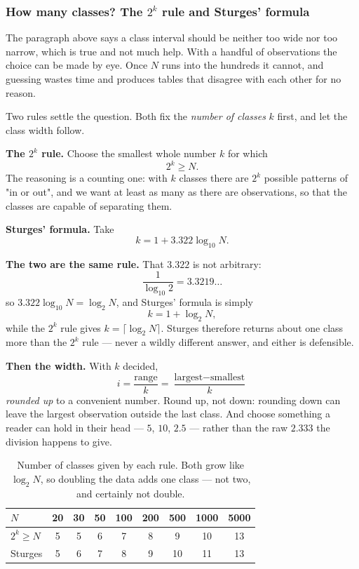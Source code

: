 \documentclass[11pt,a4paper]{article}
\theoremstyle{definition}
\begin{document}
\subsubsection{How many classes? The $2^k$ rule and Sturges' formula}

The paragraph above says a class interval should be neither too wide nor too narrow, which
is true and not much help. With a handful of observations the choice can be made by eye. Once
$N$ runs into the hundreds it cannot, and guessing wastes time and produces tables that
disagree with each other for no reason.

Two rules settle the question. Both fix the \emph{number of classes} $k$ first, and let the
class width follow.

\textbf{The $2^k$ rule.} Choose the smallest whole number $k$ for which
\[2^k\geq N.\]
The reasoning is a counting one: with $k$ classes there are $2^k$ possible patterns of
"in or out", and we want at least as many as there are observations, so that the classes are
capable of separating them.

\textbf{Sturges' formula.} Take
\[k=1+3.322\log_{10}N.\]

\textbf{The two are the same rule.} That $3.322$ is not arbitrary:
\[\frac{1}{\log_{10}2}=3.3219\ldots\]
so $3.322\log_{10}N=\log_2 N$, and Sturges' formula is simply
\[k=1+\log_2 N,\]
while the $2^k$ rule gives $k=\lceil \log_2 N\rceil$. Sturges therefore returns about one
class more than the $2^k$ rule --- never a wildly different answer, and either is defensible.

\textbf{Then the width.} With $k$ decided,
\[i=\frac{\text{range}}{k}=\frac{\text{largest}-\text{smallest}}{k}\]
\emph{rounded up} to a convenient number. Round up, not down: rounding down can leave the
largest observation outside the last class. And choose something a reader can hold in their
head --- $5$, $10$, $2.5$ --- rather than the raw $2.333$ the division happens to give.

\begin{table}[H]
\centering
\begin{tabular}{|l|c|c|c|c|c|c|c|c|}
\hline
$N$ & 20 & 30 & 50 & 100 & 200 & 500 & 1000 & 5000\\
\hline
$2^k\geq N$ & 5 & 5 & 6 & 7 & 8 & 9 & 10 & 13\\
Sturges & 5 & 6 & 7 & 8 & 9 & 10 & 11 & 13\\
\hline
\end{tabular}
\caption{Number of classes given by each rule. Both grow like $\log_2 N$, so doubling the data adds one class --- not two, and certainly not double.}
\end{table}
\end{document}
